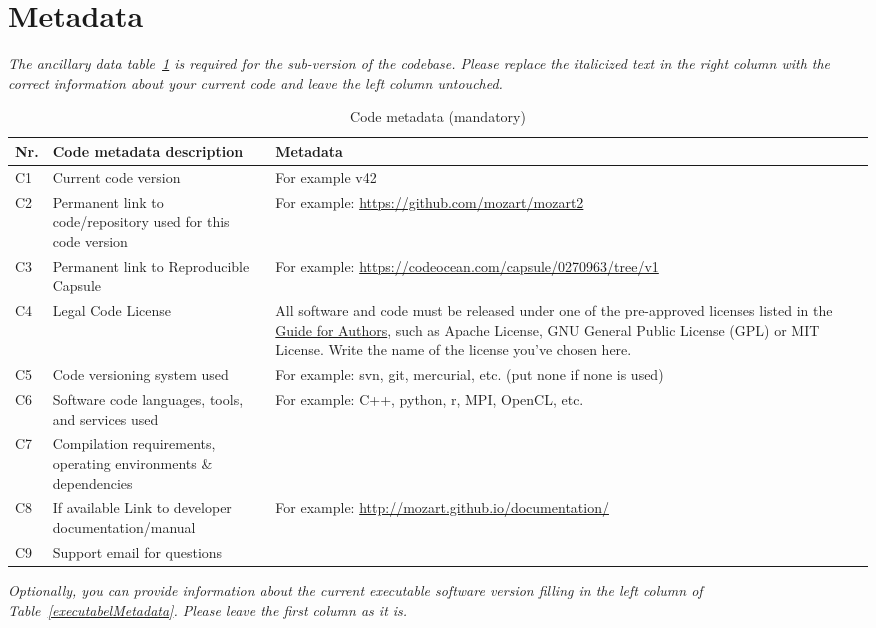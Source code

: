 \documentclass[preprint,12pt, a4paper]{elsarticle}
\begin{document}

\section*{Metadata}
\label{}
\textit{The ancillary data table~\ref{codeMetadata} is required for the sub-version of the codebase. Please replace the italicized text in the right column with the correct information about your current code and leave the left column untouched.}

\begin{table}[!h]
\begin{tabular}{|l|p{6.5cm}|p{6.5cm}|}
\hline
\textbf{Nr.} & \textbf{Code metadata description} & \textbf{Metadata} \\
\hline
C1 & Current code version & For example v42 \\
\hline
C2 & Permanent link to code/repository used for this code version & For example: \url{https://github.com/mozart/mozart2} \\
\hline
C3  & Permanent link to Reproducible Capsule & For example: \url{https://codeocean.com/capsule/0270963/tree/v1}\\
\hline
C4 & Legal Code License   & All software and code must be released under one of the pre-approved licenses listed in the \href{https://www.elsevier.com/journals/softwarex/2352-7110/guide-for-authors}{Guide for Authors}, such as Apache License, GNU General Public License (GPL) or MIT License. Write the name of the license you’ve chosen here. \\
\hline
C5 & Code versioning system used & For example: svn, git, mercurial,
                                   etc. (put none if none is used) \\
\hline
C6 & Software code languages, tools, and services used & For example: C++, python, r, MPI, OpenCL, etc. \\
\hline
C7 & Compilation requirements, operating environments \& dependencies & \\
\hline
C8 & If available Link to developer documentation/manual & For example: \url{http://mozart.github.io/documentation/} \\
\hline
C9 & Support email for questions & \\
\hline
\end{tabular}
\caption{Code metadata (mandatory)}
\label{codeMetadata} 
\end{table}

\textit{Optionally, you can provide information about the current executable
software version filling in the left column of
Table~\ref{executabelMetadata}. Please leave the first column as it is.}
\end{document}
